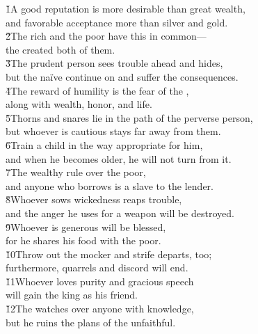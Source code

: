 \begin{poetry}
\poeml {}
\v{1}A good reputation is more desirable than great wealth, \\
\poeml and favorable acceptance more than silver and gold. \\
\poeml \v{2}The rich and the poor have this in common--- \\
\poemll    the  created both of them. \\
\poeml \v{3}The prudent person sees trouble ahead and hides, \\
\poemll    but the na\"{i}ve continue on and suffer the consequences. \\
\poeml \v{4}The reward of humility is the fear of the , \\
\poemll    along with wealth, honor, and life. \\
\poeml \v{5}Thorns and snares lie in the path of the perverse person, \\
\poemll    but whoever is cautious stays far away from them. \\
\poeml \v{6}Train a child in the way appropriate for him, \\
\poemll    and when he becomes older, he will not turn from it. \\
\poeml \v{7}The wealthy rule over the poor, \\
\poemll    and anyone who borrows is a slave to the lender. \\
\poeml \v{8}Whoever sows wickedness reaps trouble, \\
\poemll    and the anger he uses for a weapon will be destroyed. \\
\poeml \v{9}Whoever is generous will be blessed, \\
\poemll    for he shares his food with the poor. \\
\poeml \v{10}Throw out the mocker and strife departs, too; \\
\poemll    furthermore, quarrels and discord will end. \\
\poeml \v{11}Whoever loves purity and gracious speech \\
\poemll    will gain the king as his friend. \\
\poeml \v{12}The  watches over anyone with knowledge, \\
\poemll    but he ruins the plans of the unfaithful. \\

\end{poetry}
